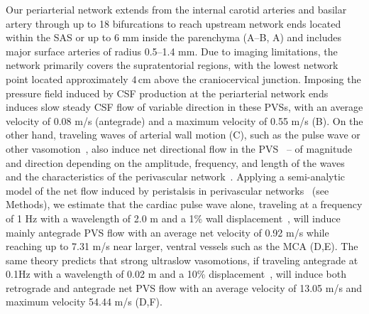 \documentclass[fleqn,10pt]{wlscirep}
\begin{document}
Our periarterial network extends from the internal carotid arteries
and basilar artery through up to 18 bifurcations to reach upstream
network ends located within the SAS or up to 6 mm inside the
parenchyma (A--B, A) and includes
major surface arteries of radius 0.5--1.4 mm. Due to imaging limitations, the network primarily covers the supratentorial regions, with the lowest network point located approximately $4\,$cm above the craniocervical junction.
Imposing the pressure field induced by CSF production at the periarterial network ends induces slow steady CSF flow of variable direction in these PVSs, with
an average velocity of 0.08 \textmu m/s (antegrade) and a maximum
velocity of 0.55 \textmu m/s (B). On the other hand,
traveling waves of arterial wall motion (C), such as
the pulse wave or other vasomotion~\cite{vanveluw2020vasomotion,
  munting2023spontaneous, bojarskaite2023sleep,
  broggini2024long,hauglund2025norepinephrine}, also induce net
directional flow in the PVS~\cite{kedarasetti2020arterial,
  kedarasetti2020functional, coenen2021lubrication,
  gjerde2023directional, nozaleda2024arterial} -- of magnitude and
direction depending on the amplitude, frequency, and length of the
waves and the characteristics of the perivascular
network~\cite{gjerde2023directional}. Applying a semi-analytic model
of the net flow induced by peristalsis in perivascular
networks~\cite{gjerde2023directional} (see Methods), we estimate that
the cardiac pulse wave alone, traveling at a frequency of 1 Hz with a
wavelength of 2.0 m and a 1\% wall displacement~\cite{jung2021novel},
will induce mainly antegrade PVS flow with an average net velocity of
0.92 \textmu m/s while reaching up to 7.31 \textmu m/s near larger,
ventral vessels such as the MCA (D,E). The same theory
predicts that strong ultraslow vasomotions, if traveling antegrade at
0.1Hz with a wavelength of 0.02 m and a 10\%
displacement~\cite{broggini2024long}, will induce both retrograde and
antegrade net PVS flow with an average velocity of 13.05 \textmu m/s
and maximum velocity 54.44 \textmu m/s (D,F).
\end{document}
